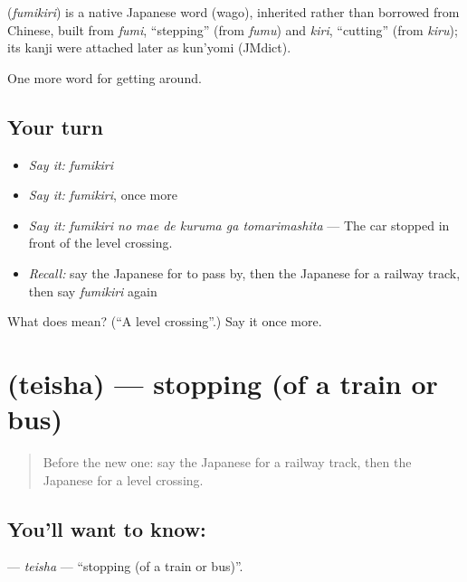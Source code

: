\begin{cousinweb}
\textbf{} (\emph{fumikiri}) is a native Japanese word (wago), inherited rather than borrowed from Chinese, built from \emph{fumi}, \textquotedblleft{}stepping\textquotedblright{} (from \emph{fumu}) and \emph{kiri}, \textquotedblleft{}cutting\textquotedblright{} (from \emph{kiru}); its kanji were attached later as kun'yomi (JMdict).
\end{cousinweb}

\begin{grammarlens}[title={What you've built}]
One more word for getting around.
\end{grammarlens}

\subsection*{Your turn}
\begin{itemize}
\raggedright
  \item \emph{Say it:} \emph{fumikiri}
  \item \emph{Say it:} \emph{fumikiri}, once more
  \item \emph{Say it:} \emph{fumikiri no mae de kuruma ga tomarimashita} — The car stopped in front of the level crossing.
  \item \emph{Recall:} say the Japanese for to pass by, then the Japanese for a railway track, then say \emph{fumikiri} again
\end{itemize}

\begin{tcolorbox}[breakable,colback=teal!4,colframe=teal!35!black,title={Before you move on}]
What does  mean? (\textquotedblleft{}A level crossing\textquotedblright{}.) Say it once more.
\end{tcolorbox}
\section[\texorpdfstring{\ja{ていしゃ} (teisha)}{ていしゃ (teisha)}]{ (teisha) — stopping (of a train or bus)}

\label{lesson:JA-C374-teisha}



\begin{quote}
Before the new one: say the Japanese for a railway track, then the Japanese for a level crossing.
\end{quote}

\subsection*{You'll want to know: }
\textbf{} — \emph{teisha} — \textquotedblleft{}stopping (of a train or bus)\textquotedblright{}.

